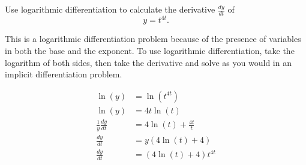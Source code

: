 \documentclass{ximera}
\author{Emma Smith Zbarsky}
\begin{document}
\begin{exercise}

Use logarithmic differentiation to calculate the derivative
$\frac{dy}{dt}$ of \[y = t^{4t}.\]


\begin{hint}
This is a logarithmic differentiation problem because of the presence of
variables in both the base and the exponent. To use logarithmic
differentiation, take the logarithm of both sides, then take the
derivative and solve as you would in an implicit differentiation
problem.
\end{hint}


\begin{hint}
\begin{align*}
\ln(y) &= \ln\left(t^{4t}\right) \\
\ln(y) &= 4t\ln\left(t\right) \\
\frac{1}{y}\frac{dy}{dt} &= 4\ln(t)+\frac{4t}{t} \\
\frac{dy}{dt} &= y\left(4\ln(t) + 4\right) \\
\frac{dy}{dt} &= \left(4\ln(t) + 4\right)t^{4t} \\
\end{align*}
\end{hint}


\begin{multipleChoice}
\end{multipleChoice}

\end{exercise}
\end{document}
